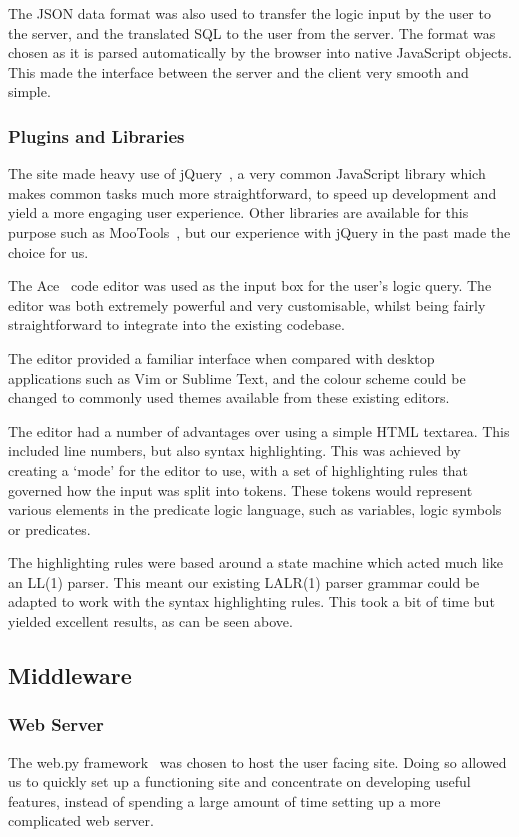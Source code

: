 \documentclass[a4paper, 11pt]{article}
\begin{document}
      The JSON data format was also used to transfer the logic input by the user
      to the server, and the translated SQL to the user from the server. The
      format was chosen as it is parsed automatically by the browser into
      native JavaScript objects. This made the interface between the server and
      the client very smooth and simple.

    \subsubsection{Plugins and Libraries}
      The site made heavy use of jQuery~\cite{jquery}, a very common JavaScript
      library which makes common tasks much more straightforward, to speed up
      development and yield a more engaging user experience. Other libraries are
      available for this purpose such as MooTools~\cite{mootools}, but our
      experience with jQuery in the past made the choice for us.

      The Ace~\cite{aceEditor} code editor was used as the input box for the
      user's logic query. The editor was both extremely powerful and very
      customisable, whilst being fairly straightforward to integrate into the
      existing codebase.

      The editor provided a familiar interface when compared with desktop
      applications such as Vim or Sublime Text, and the colour scheme could be
      changed to commonly used themes available from these existing editors.

      The editor had a number of advantages over using a simple HTML textarea.
      This included line numbers, but also syntax highlighting. This was
      achieved by creating a `mode' for the editor to use, with a set of
      highlighting rules that governed how the input was split into tokens. These
      tokens would represent various elements in the predicate logic language,
      such as variables, logic symbols or predicates.

      The highlighting rules were based around a state machine which acted much
      like an LL(1) parser. This meant our existing LALR(1) parser grammar could
      be adapted to work with the syntax highlighting rules. This took a bit of
      time but yielded excellent results, as can be seen above.

  \subsection{Middleware}
    \subsubsection{Web Server}
      The web.py framework~\cite{webpy} was chosen to host the user facing site.
      Doing so allowed us to quickly set up a functioning site and concentrate
      on developing useful features, instead of spending a large amount of time
      setting up a more complicated web server.
\end{document}
